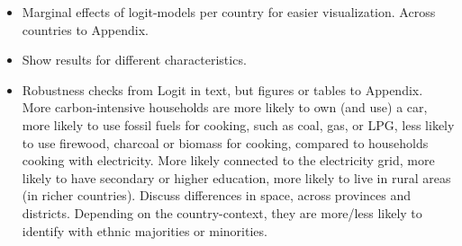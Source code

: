 \documentclass[12pt, a4paper]{article}
\begin{document}
\begin{itemize}
    \item Marginal effects of logit-models per country for easier visualization. Across countries to Appendix.
    \item Show results for different characteristics.
  \item Robustness checks from Logit in text, but figures or tables to Appendix. More carbon-intensive households are more likely to own (and use) a car, more likely to use fossil fuels for cooking, such as coal, gas, or LPG, less likely to use firewood, charcoal or biomass for cooking, compared to households cooking with electricity. More likely connected to the electricity grid, more likely to have secondary or higher education, more likely to live in rural areas (in richer countries). Discuss differences in space, across provinces and districts. Depending on the country-context, they are more/less likely to identify with ethnic majorities or minorities.

\end{itemize}
\end{document}
